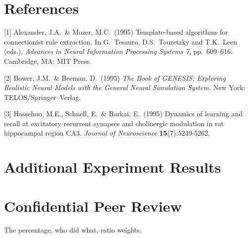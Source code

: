 \documentclass{article}
\begin{document}
\section*{References}

{
\small


[1] Alexander, J.A.\ \& Mozer, M.C.\ (1995) Template-based algorithms for
connectionist rule extraction. In G.\ Tesauro, D.S.\ Touretzky and T.K.\ Leen
(eds.), {\it Advances in Neural Information Processing Systems 7},
pp.\ 609--616. Cambridge, MA: MIT Press.


[2] Bower, J.M.\ \& Beeman, D.\ (1995) {\it The Book of GENESIS: Exploring
  Realistic Neural Models with the General Neural Simulation System.}  New York:
TELOS/Springer--Verlag.


[3] Hasselmo, M.E., Schnell, E.\ \& Barkai, E.\ (1995) Dynamics of learning and
recall at excitatory recurrent synapses and cholinergic modulation in rat
hippocampal region CA3. {\it Journal of Neuroscience} {\bf 15}(7):5249-5262.
}

\section*{Additional Experiment Results}

\section*{Confidential Peer Review} 

The percentage, who did what, ratio weights. 
\end{document}
